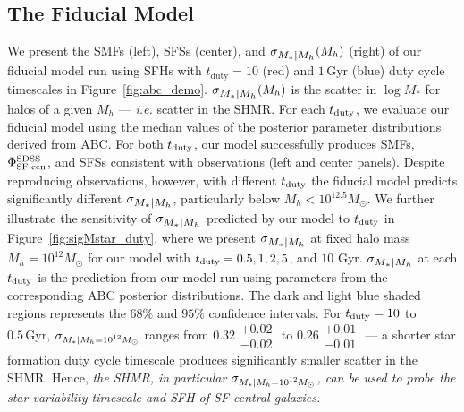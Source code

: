 \documentclass[12pt, letterpaper, preprint, tighten]{aastex62}
\newcommand{\tduty}{t_{\rm duty}}
\newcommand{\siglogm}{\sigma_{\scaleto{M_*|M_h}{8pt}}}
\newcommand{\sigtwe}{\sigma_{\scaleto{M_*|M_h=10^{12}M_\odot}{8pt}}}
\begin{document}
\subsection{The Fiducial Model} \label{sec:sfdutycycle}
We present the SMFs (left), SFSs (center), and $\siglogm(M_h)$ (right) of our 
fiducial model run using SFHs with 
$t_\mathrm{duty} = 10$ (red) and $1\,\mathrm{Gyr}$ (blue) duty cycle timescales 
in Figure~\ref{fig:abc_demo}. $\siglogm(M_h)$ is the scatter in $\log M_*$ for 
halos of a given $M_h$ --- \emph{i.e.} scatter in the SHMR. For each $\tduty$,
we evaluate our fiducial model using the median values of the posterior parameter 
distributions derived from ABC. For both $\tduty$, our model successfully produces 
SMFs, $\Phi^{\rm SDSS}_{\rm SF,cen}$, and SFSs consistent with observations (left 
and center panels). Despite reproducing observations, however, with different 
$t_{\rm duty}$ the fiducial model predicts significantly different $\siglogm$, 
particularly below $M_h < 10^{12.5}M_\odot$. We further illustrate the sensitivity 
of $\siglogm$ predicted by our model to $\tduty$ in Figure~\ref{fig:sigMstar_duty}, 
where we present $\siglogm$ at fixed halo mass $M_h = 10^{12} M_\odot$ for our 
model with $t_{\rm duty} = 0.5, 1, 2, 5$, and $10$ Gyr. $\siglogm$ at each $t_{\rm duty}$
is the prediction from our model run using parameters from the corresponding ABC 
posterior distributions. The dark and light blue shaded regions represents the 
$68\%$ and $95\%$ confidence intervals. For $t_{\rm duty} = 10$ to $0.5\,\mathrm{Gyr}$,
$\sigtwe$ ranges from $0.32\substack{+0.02\\ -0.02}$ to $0.26\substack{+0.01\\-0.01}$
--- a shorter star formation duty cycle timescale produces significantly
smaller scatter in the SHMR. 
Hence, \emph{the SHMR, in particular $\sigtwe$, can be used to probe the star variability timescale and SFH of SF central galaxies.}
\end{document}
